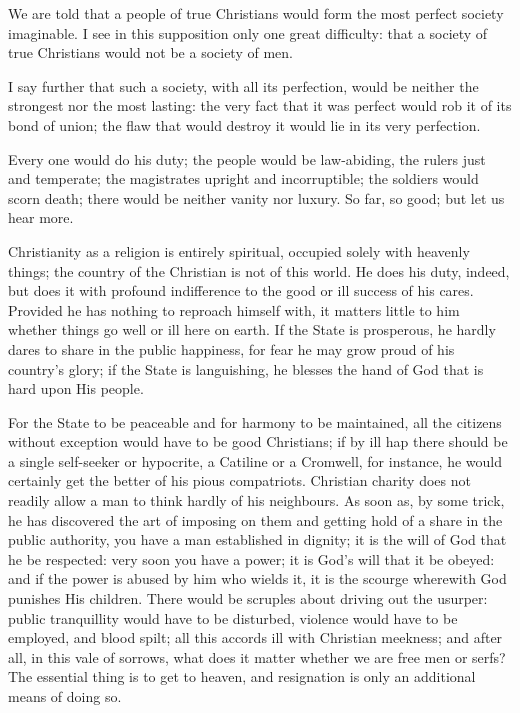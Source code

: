 \documentclass[12pt]{book}
\begin{document}
We are told that a people of true Christians would form the most perfect society imaginable. I see in this supposition only one great difficulty: that a society of true Christians would not be a society of men.

I say further that such a society, with all its perfection, would be neither the strongest nor the most lasting: the very fact that it was perfect would rob it of its bond of union; the flaw that would destroy it would lie in its very perfection.

Every one would do his duty; the people would be law-abiding, the rulers just and temperate; the magistrates upright and incorruptible; the soldiers would scorn death; there would be neither vanity nor luxury. So far, so good; but let us hear more.

Christianity as a religion is entirely spiritual, occupied solely with heavenly things; the country of the Christian is not of this world. He does his duty, indeed, but does it with profound indifference to the good or ill success of his cares. Provided he has nothing to reproach himself with, it matters little to him whether things go well or ill here on earth. If the State is prosperous, he hardly dares to share in the public happiness, for fear he may grow proud of his country's glory; if the State is languishing, he blesses the hand of God that is hard upon His people.

For the State to be peaceable and for harmony to be maintained, all the citizens without exception would have to be good Christians; if by ill hap there should be a single self-seeker or hypocrite, a Catiline or a Cromwell, for instance, he would certainly get the better of his pious compatriots. Christian charity does not readily allow a man to think hardly of his neighbours. As soon as, by some trick, he has discovered the art of imposing on them and getting hold of a share in the public authority, you have a man established in dignity; it is the will of God that he be respected: very soon you have a power; it is God's will that it be obeyed: and if the power is abused by him who wields it, it is the scourge wherewith God punishes His children. There would be scruples about driving out the usurper: public tranquillity would have to be disturbed, violence would have to be employed, and blood spilt; all this accords ill with Christian meekness; and after all, in this vale of sorrows, what does it matter whether we are free men or serfs? The essential thing is to get to heaven, and resignation is only an additional means of doing so.
\end{document}
